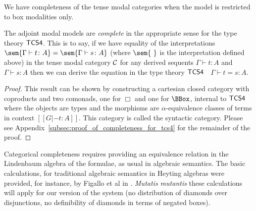 We  have completeness of the tense modal categories when the model is restricted to box modalities only.

\begin{theorem}
\label{thm:tcs4-completeness}
The adjoint modal models are \textit{complete} in the appropriate
sense for the type theory $\sf{TCS4}$. This is to say, if we have
equality of the interpretations $\sem{\Gamma \vdash t \colon A} =
\sem{\Gamma \vdash s \colon A}$ (where \mbox{$\sem{\ } $} is the
interpretation defined above) in the tense modal category $\cal C$ for
any derived sequents $\Gamma \vdash t \colon A$ and $\Gamma \vdash s
\colon A$ then we can derive the equation in the type theory
$\sf{TCS4}$ $\;$ $\Gamma \vdash t = s \colon A$.
\end{theorem}
\begin{proof}
  This result can be shown by constructing a cartesian closed category
  with coproducts and two comonads, one for $\Box$ and one for
  $\BBox$, internal to $\sf{TCS4}$ where the objects are types and the
  morphisms are $\alpha$-equivalence classes of terms in context $[[G
      |- t : A]]$.  This category is called the syntactic
  category. Please see
  Appendix~\ref{subsec:proof_of_completeness_for_tcs4} for the
  remainder of the proof.
\end{proof}
Categorical completeness requires providing an equivalence relation in
the Lindenbaum algebra of the formulae, as usual in algebraic
semantics. The basic calculations, for traditional algebraic semantics
in Heyting algebras were provided, for instance, by Figallo et al in
\cite{figallo2014}. \textit{Mutatis mutantis} these calculations will
apply for our version of the system (no distribution of diamonds over
disjunctions, no definibility of diamonds in terms of negated boxes).
